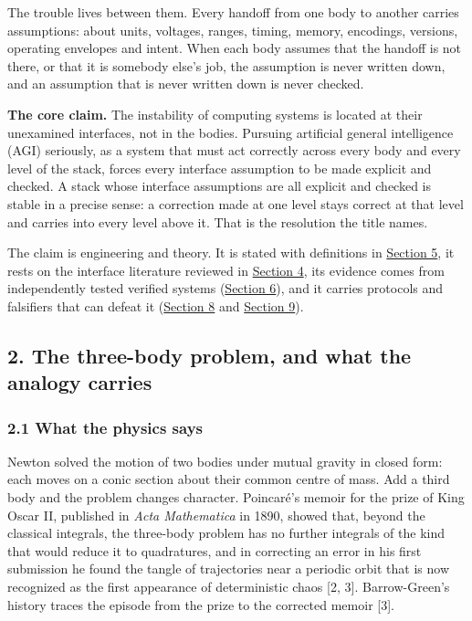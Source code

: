 \documentclass[
  10pt,
]{article}
\begin{document}
The trouble lives between them. Every handoff from one body to another
carries assumptions: about units, voltages, ranges, timing, memory,
encodings, versions, operating envelopes and intent. When each body
assumes that the handoff is not there, or that it is somebody else's
job, the assumption is never written down, and an assumption that is
never written down is never checked.

\textbf{The core claim.} The instability of computing systems is located
at their unexamined interfaces, not in the bodies. Pursuing artificial
general intelligence (AGI) seriously, as a system that must act
correctly across every body and every level of the stack, forces every
interface assumption to be made explicit and checked. A stack whose
interface assumptions are all explicit and checked is stable in a
precise sense: a correction made at one level stays correct at that
level and carries into every level above it. That is the resolution the
title names.

The claim is engineering and theory. It is stated with definitions in
\href{https://research.openie.dev/papers/three-body/\#5-definitions-and-propositions}{Section
5}, it rests on the interface literature reviewed in
\href{https://research.openie.dev/papers/three-body/\#4-the-interface-literature}{Section
4}, its evidence comes from independently tested verified systems
(\href{https://research.openie.dev/papers/three-body/\#6-the-stabilized-configuration}{Section
6}), and it carries protocols and falsifiers that can defeat it
(\href{https://research.openie.dev/papers/three-body/\#8-protocols}{Section
8} and
\href{https://research.openie.dev/papers/three-body/\#9-falsifiers}{Section
9}).

\subsection{2. The three-body problem, and what the analogy
carries}\label{the-three-body-problem-and-what-the-analogy-carries}

\subsubsection{2.1 What the physics says}\label{what-the-physics-says}

Newton solved the motion of two bodies under mutual gravity in closed
form: each moves on a conic section about their common centre of mass.
Add a third body and the problem changes character. Poincaré's memoir
for the prize of King Oscar II, published in \emph{Acta Mathematica} in
1890, showed that, beyond the classical integrals, the three-body
problem has no further integrals of the kind that would reduce it to
quadratures, and in correcting an error in his first submission he found
the tangle of trajectories near a periodic orbit that is now recognized
as the first appearance of deterministic chaos {[}2, 3{]}.
Barrow-Green's history traces the episode from the prize to the
corrected memoir {[}3{]}.
\end{document}
